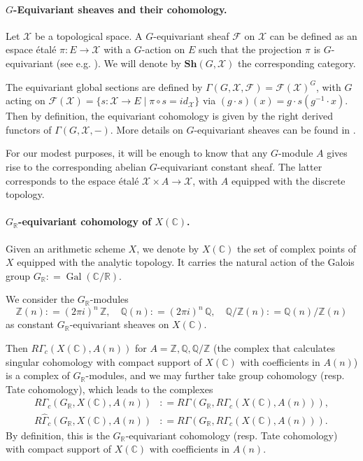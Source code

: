 \documentclass[leqno,12pt]{article}
\theoremstyle{plain}
\theoremstyle{definition}
\DeclareMathOperator{\Gal}{Gal}
\newcommand{\CC}{\mathbb{C}}
\newcommand{\QQ}{\mathbb{Q}}
\newcommand{\RR}{\mathbb{R}}
\newcommand{\ZZ}{\mathbb{Z}}
\newcommand{\dfn}{\mathrel{\mathop:}=}
\begin{document}
\paragraph{$G$-Equivariant sheaves and their cohomology.}
Let $\mathcal{X}$ be a topological space. A $G$-equivariant sheaf $\mathcal{F}$
on $\mathcal{X}$ can be defined as an espace \'{e}tal\'{e}
$\pi\colon E\to \mathcal{X}$ with a $G$-action on $E$ such that the projection
$\pi$ is $G$-equivariant
(see e.g. \cite[\S II.6 + pp.\,594]{MacLane-Moerdijk}). We will denote by
$\mathbf{Sh} (G, \mathcal{X})$ the corresponding category.

The equivariant global sections are defined by
$\Gamma (G,\mathcal{X},\mathcal{F}) = \mathcal{F} (\mathcal{X})^G$, with $G$ acting on
$\mathcal{F} (\mathcal{X}) = \{ s\colon \mathcal{X}\to E \mid \pi\circ s = id_\mathcal{X} \}$ via
$(g\cdot s) (x) = g\cdot s (g^{-1}\cdot x)$. Then by definition, the equivariant
cohomology is given by the right derived functors of $\Gamma (G,\mathcal{X},-)$.
More details on $G$-equivariant sheaves can be found in
\cite[Chapitre~2]{Morin-these}.

For our modest purposes, it will be enough to know that any $G$-module $A$ gives
rise to the corresponding abelian $G$-equivariant constant sheaf. The latter
corresponds to the espace \'{e}tal\'{e} $\mathcal{X}\times A \to \mathcal{X}$,
with $A$ equipped with the discrete topology.

\paragraph{$G_\RR$-equivariant cohomology of $X (\CC)$.}
Given an arithmetic scheme $X$, we denote by $X (\CC)$ the set of complex points
of $X$ equipped with the analytic topology. It carries the natural action of the
Galois group $G_\RR \dfn \Gal (\CC/\RR)$.

We consider the $G_\RR$-modules
\[ \ZZ (n) \dfn (2\pi i)^n\,\ZZ, \quad
  \QQ (n) \dfn (2\pi i)^n\,\QQ, \quad
  \QQ/\ZZ (n) \dfn \QQ (n) / \ZZ (n) \]
as constant $G_\RR$-equivariant sheaves on $X (\CC)$.

Then $R\Gamma_c (X (\CC), A (n))$ for $A = \ZZ, \QQ, \QQ/\ZZ$ (the complex that
calculates singular cohomology with compact support of $X (\CC)$ with
coefficients in $A (n)$) is a complex of $G_\RR$-modules, and we may further
take group cohomology (resp. Tate cohomology), which leads to the complexes
\begin{align*}
  R\Gamma_c (G_\RR, X (\CC), A (n)) & \dfn R\Gamma (G_\RR, R\Gamma_c (X (\CC), A (n))),\\
  R\widehat{\Gamma}_c (G_\RR, X (\CC), A (n)) & \dfn R\widehat{\Gamma} (G_\RR, R\Gamma_c (X (\CC), A (n))).
\end{align*}
By definition, this is the $G_\RR$-equivariant cohomology (resp. Tate
cohomology) with compact support of $X (\CC)$ with coefficients in $A (n)$.
\end{document}
